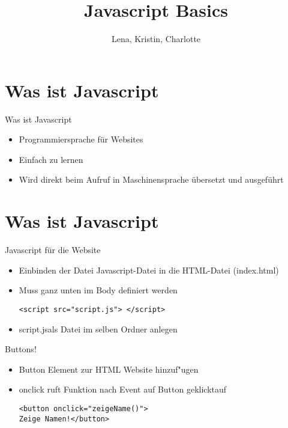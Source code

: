 \documentclass[18pt]{beamer}
\title[Javascript Basics]{Javascript Basics}
\author{Lena, Kristin, Charlotte}
\begin{document}

\begin{frame}
\titlepage
\end{frame}

\section {Was ist Javascript}
\begin{frame}{Was ist Javascript}
\begin {itemize}
\item Programmiersprache für Websites
\item Einfach zu lernen 
\item Wird direkt beim Aufruf in Maschinensprache übersetzt und ausgeführt
\end {itemize}
\end{frame}

\section {Was ist Javascript}
\begin{frame}[fragile]{Javascript für die Website}
\begin {itemize}
\item Einbinden der Datei Javascript-Datei in die HTML-Datei (index.html)
\item Muss ganz unten im Body definiert werden
\begin{lstlisting}
<script src="script.js"> </script>
\end{lstlisting}
\item \glqq script.js\grqq als Datei im selben Ordner anlegen
\end {itemize}
\end{frame}


\begin{frame}[fragile]{Buttons!}
\begin {itemize}
\item Button Element zur HTML Website hinzuf"ugen
\item onclick ruft Funktion nach Event \glqq auf Button geklickt\grqq auf
\begin{lstlisting}
<button onclick="zeigeName()">
Zeige Namen!</button>
\end{lstlisting}
\end {itemize}
\end{frame}
\end{document}
